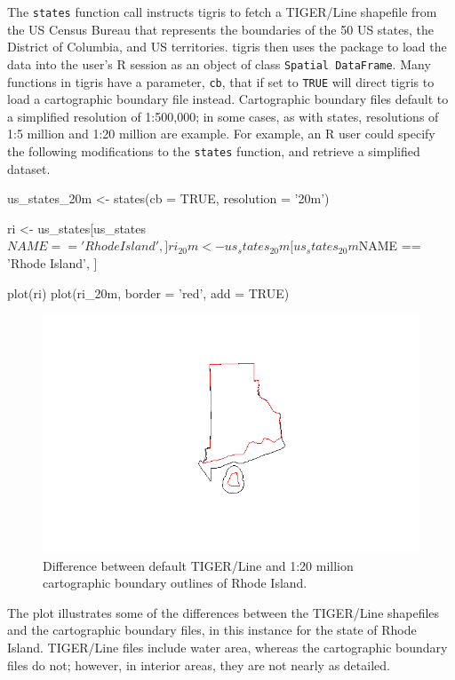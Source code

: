 The \texttt{states} function call instructs tigris to fetch a TIGER/Line
shapefile from the US Census Bureau that represents the boundaries of
the 50 US states, the District of Columbia, and US territories. tigris
then uses the  package to load the data into the user's R
session as an object of class \texttt{Spatial\ DataFrame}. Many
functions in tigris have a parameter, \texttt{cb}, that if set to
\texttt{TRUE} will direct tigris to load a cartographic boundary file
instead. Cartographic boundary files default to a simplified resolution
of 1:500,000; in some cases, as with states, resolutions of 1:5 million
and 1:20 million are example. For example, an R user could specify the
following modifications to the \texttt{states} function, and retrieve a
simplified dataset.

\begin{Schunk}
\begin{Sinput}
us_states_20m <- states(cb = TRUE, resolution = '20m')

ri <- us_states[us_states$NAME == 'Rhode Island', ]
ri_20m <- us_states_20m[us_states_20m$NAME == 'Rhode Island', ]

plot(ri)
plot(ri_20m, border = 'red', add = TRUE)
\end{Sinput}
\end{Schunk}

\begin{figure}[htbp]
  \centering
  \includegraphics[width=\textwidth]{rhode-island}
  \caption{Difference between default TIGER/Line and 1:20 million cartographic boundary outlines of Rhode Island.}
  \label{figure:rhode_island}
\end{figure}

The plot illustrates some of the differences between the TIGER/Line
shapefiles and the cartographic boundary files, in this instance for the
state of Rhode Island. TIGER/Line files include water area, whereas the
cartographic boundary files do not; however, in interior areas, they are
not nearly as detailed.

